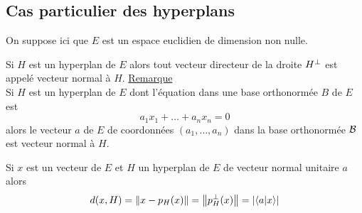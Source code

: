 \subsection{Cas particulier des hyperplans}
    On suppose ici que \(E\) est un espace euclidien de dimension non nulle.
\begin{defprop}
    Si \(H\) est un hyperplan de \(E\) alors tout vecteur directeur de la droite \(H\ortho\) est appelé vecteur normal à \(H\).
    \underline{Remarque}\\
    Si \(H\) est un hyperplan de \(E\) dont l’équation dans une base orthonormée \(B\) de \(E\) est
    \[a_1x_1 + \dots + a_nx_n = 0\]
    alors le vecteur \(a\) de \(E\) de coordonnées \((a_1, \dots , a_n)\) dans la base orthonormée \(\cal{B}\) est vecteur normal à \(H\).
\end{defprop}

\begin{defprop}
    Si \(x\) est un vecteur de \(E\) et \(H\) un hyperplan de \(E\) de vecteur normal unitaire \(a\) alors
    \[d(x, H) = \norme{x - p_H (x)} = \norme{p_H\ortho (x)} = \abs{\scal{a}{x}}\]
\end{defprop}